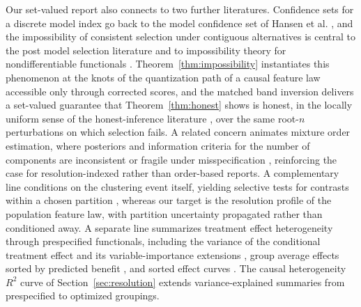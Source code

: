 \documentclass[11pt]{article}
\begin{document}
Our set-valued report also connects to two further literatures. Confidence sets for a discrete model index go back to the model confidence set of Hansen et al. \cite{hansen2011}, and the impossibility of consistent selection under contiguous alternatives is central to the post model selection literature \citep{leeb2005,leeb2006} and to impossibility theory for nondifferentiable functionals \citep{hirano2012}. Theorem~\ref{thm:impossibility} instantiates this phenomenon at the knots of the quantization path of a causal feature law accessible only through corrected scores, and the matched band inversion delivers a set-valued guarantee that Theorem~\ref{thm:honest} shows is honest, in the locally uniform sense of the honest-inference literature \citep{li1989}, over the same root-$n$ perturbations on which selection fails. A related concern animates mixture order estimation, where posteriors and information criteria for the number of components are inconsistent or fragile under misspecification \citep{miller2014,rousseau2011}, reinforcing the case for resolution-indexed rather than order-based reports. A complementary line conditions on the clustering event itself, yielding selective tests for contrasts within a chosen partition \citep{gao2024}, whereas our target is the resolution profile of the population feature law, with partition uncertainty propagated rather than conditioned away. A separate line summarizes treatment effect heterogeneity through prespecified functionals, including the variance of the conditional treatment effect and its variable-importance extensions \citep{levy2021,hines2022}, group average effects sorted by predicted benefit \citep{chernozhukov2025generic}, and sorted effect curves \citep{chernozhukov2018sorted}. The causal heterogeneity $R^2$ curve of Section~\ref{sec:resolution} extends variance-explained summaries from prespecified to optimized groupings.
\end{document}
